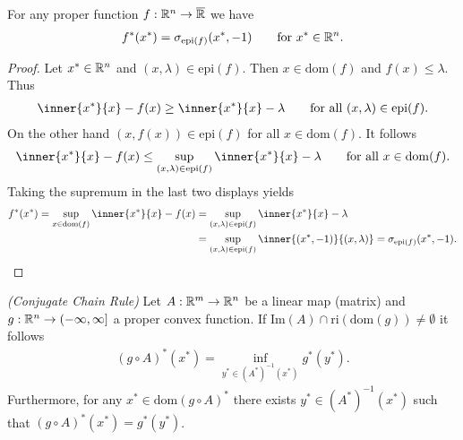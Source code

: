 \begin{lemma}
  For any proper function
  $
    f:\mathbb{R}^n\to\overline{\mathbb{R}}
  $
  we have
  \begin{gather}
    f^*(x^*) 
    =
    \sigma_{\mathrm{epi}(f)}
    (x^*,-1)
    \qquad
    \text{for}
    \ 
    x^* \in \R^n.
  \end{gather}
\end{lemma}
\begin{proof}
  Let $x^*\in\mathbb{R}^n$
  and
  $
    (x,\lambda)\in \mathrm{epi}(f).
  $
  Then
  $
    x \in \mathrm{dom}(f)
  $
  and
  $
    f(x)\le \lambda.
  $
  Thus
  \begin{gather}
    \inner{x^*}{x} - f(x)
    \ge
    \inner{x^*}{x} - \lambda
    \qquad
    \text{for all}\ 
    (x,\lambda)\in \mathrm{epi}(f).
  \end{gather}
  On the other hand 
  $
    (x,f(x))\in \mathrm{epi}(f)
  $
  for all
  $
    x \in \mathrm{dom}(f).
  $
  It follows
  \begin{gather}
    \inner{x^*}{x} - f(x)
    \le
    \sup_{(x,\lambda)\in\mathrm{epi}(f)}
    \inner{x^*}{x} - \lambda
    \qquad
    \text{for all}\ 
    x \in \mathrm{dom}(f).
  \end{gather}
  Taking the supremum in the last two displays yields
  \begin{align}
    f^*(x^*)
    =
    \sup_{x\in\mathrm{dom}(f)}
    \inner{x^*}{x} - f(x)
    &=
    \sup_{(x,\lambda)\in\mathrm{epi}(f)}
    \inner{x^*}{x} - \lambda
    \\
    &=
    \sup_{(x,\lambda)\in\mathrm{epi}(f)}
    \inner{(x^*,-1)}{(x,\lambda)} 
    =
    \sigma_{\mathrm{epi}(f)}
    (x^*,-1).
  \end{align}
\end{proof}
\begin{proposition}

\end{proposition}
\begin{theorem}
  \emph{(Conjugate Chain Rule)}
  \label{cvxa_conjugate_chain_rule}
  Let 
  $
    A:
      \mathbb{R}^m \to \mathbb{R}^n
  $
  be a linear map (matrix)
  and
  $
    g:
      \mathbb{R}^n \to (-\infty, \infty]
  $
  a proper convex function. If
  $
    \text{Im}(A) \cap \text{ri}(\text{dom}(g))
    \neq
    \emptyset
  $
  it follows
  \begin{gather}
    ( g \circ A )^* ( x^* )
    =
    \inf_
          { y^* \in ( A^* )^{ -1 } ( x^* )}
                                          g^*( y^* )
                                          .
  \end{gather}
  Furthermore, 
    for any 
      $
        x^* \in \text{dom}( g \circ A)^*
      $
        there exists
          $
            y^* \in ( A^* )^{ -1 } ( x^* )
          $
            such that
              $
                ( g \circ A)^* ( x^* )
                =
                g^*( y^* )
              $.
\end{theorem}


